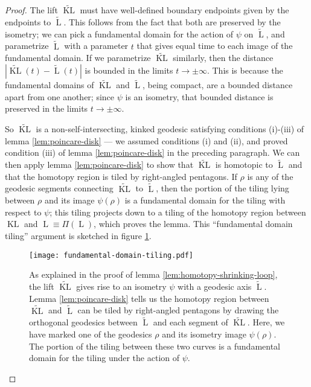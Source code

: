 \documentclass[a4paper,11pt]{article}
\renewcommand{\tilde}{\widetilde}
\newcommand{\KL}{\operatorname{KL}}
\renewcommand{\L}{\operatorname{L}}
\begin{document}
\begin{proof}
    The lift $\tilde{\KL}$ must have well-defined boundary endpoints given by the endpoints to $\tilde{\L}$. This follows from the fact that both are preserved by the isometry; we can pick a fundamental domain for the action of $\psi$ on $\tilde{\L}$, and parametrize $\tilde{\L}$ with a parameter $t$ that gives equal time to each image of the fundamental domain. If we parametrize $\tilde{\KL}$ similarly, then the distance $|\tilde{\KL}(t) - \tilde{\L}(t)|$ is bounded in the limits $t \rightarrow \pm \infty.$ This is because the fundamental domains of $\tilde{\KL}$ and $\tilde{\L}$, being compact, are a bounded distance apart from one another; since $\psi$ is an isometry, that bounded distance is preserved in the limits $t \rightarrow \pm \infty.$
    
    So $\tilde{\KL}$ is a non-self-intersecting, kinked geodesic satisfying conditions (i)-(iii) of lemma \ref{lem:poincare-disk} --- we assumed conditions (i) and (ii), and proved condition (iii) of lemma \ref{lem:poincare-disk} in the preceding paragraph. We can then apply lemma \ref{lem:poincare-disk} to show that $\tilde{\KL}$ is homotopic to $\tilde{\L}$ and that the homotopy region is tiled by right-angled pentagons. If $\rho$ is any of the geodesic segments connecting $\tilde{\KL}$ to $\tilde{\L}$, then the portion of the tiling lying between $\rho$ and its image $\psi(\rho)$ is a fundamental domain for the tiling with respect to $\psi$; this tiling projects down to a tiling of the homotopy region between $\KL$ and $\L \equiv \Pi(\L)$, which proves the lemma. This ``fundamental domain tiling'' argument is sketched in figure \ref{fig:fundamental-domain-tiling}.
    
    \begin{figure}
        \centering
        \texttt{[image: fundamental-domain-tiling.pdf]}
        \caption{As explained in the proof of lemma \ref{lem:homotopy-shrinking-loop}, the lift $\tilde{\KL}$ gives rise to an isometry $\psi$ with a geodesic axis $\tilde{\L}$. Lemma \ref{lem:poincare-disk} tells us the homotopy region between $\tilde{\KL}$ and $\tilde{\L}$ can be tiled by right-angled pentagons by drawing the orthogonal geodesics between $\tilde{\L}$ and each segment of $\tilde{\KL}$. Here, we have marked one of the geodesics $\rho$ and its isometry image $\psi(\rho)$. The portion of the tiling between these two curves is a fundamental domain for the tiling under the action of $\psi.$}
        \label{fig:fundamental-domain-tiling}
    \end{figure}
    
\end{proof}
\end{document}
